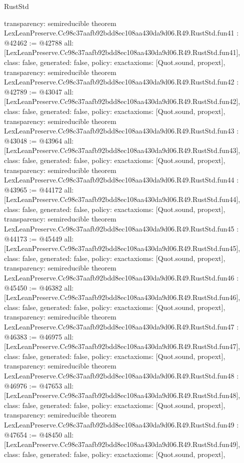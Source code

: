 \begin{lexlean}{RustStd}
\begin{coremodule}
{  transparency: semireducible
}
theorem LexLeanPreserve.Cc98c37aafb92bdd8ec108aa430da9d06.R49.RustStd.fun41 : @42462 := @42788 {
  all: [LexLeanPreserve.Cc98c37aafb92bdd8ec108aa430da9d06.R49.RustStd.fun41],
  class: false,
  generated: false,
  policy: exact{axioms: [Quot.sound, propext]},
  transparency: semireducible
}
theorem LexLeanPreserve.Cc98c37aafb92bdd8ec108aa430da9d06.R49.RustStd.fun42 : @42789 := @43047 {
  all: [LexLeanPreserve.Cc98c37aafb92bdd8ec108aa430da9d06.R49.RustStd.fun42],
  class: false,
  generated: false,
  policy: exact{axioms: [Quot.sound, propext]},
  transparency: semireducible
}
theorem LexLeanPreserve.Cc98c37aafb92bdd8ec108aa430da9d06.R49.RustStd.fun43 : @43048 := @43964 {
  all: [LexLeanPreserve.Cc98c37aafb92bdd8ec108aa430da9d06.R49.RustStd.fun43],
  class: false,
  generated: false,
  policy: exact{axioms: [Quot.sound, propext]},
  transparency: semireducible
}
theorem LexLeanPreserve.Cc98c37aafb92bdd8ec108aa430da9d06.R49.RustStd.fun44 : @43965 := @44172 {
  all: [LexLeanPreserve.Cc98c37aafb92bdd8ec108aa430da9d06.R49.RustStd.fun44],
  class: false,
  generated: false,
  policy: exact{axioms: [Quot.sound, propext]},
  transparency: semireducible
}
theorem LexLeanPreserve.Cc98c37aafb92bdd8ec108aa430da9d06.R49.RustStd.fun45 : @44173 := @45449 {
  all: [LexLeanPreserve.Cc98c37aafb92bdd8ec108aa430da9d06.R49.RustStd.fun45],
  class: false,
  generated: false,
  policy: exact{axioms: [Quot.sound, propext]},
  transparency: semireducible
}
theorem LexLeanPreserve.Cc98c37aafb92bdd8ec108aa430da9d06.R49.RustStd.fun46 : @45450 := @46382 {
  all: [LexLeanPreserve.Cc98c37aafb92bdd8ec108aa430da9d06.R49.RustStd.fun46],
  class: false,
  generated: false,
  policy: exact{axioms: [Quot.sound, propext]},
  transparency: semireducible
}
theorem LexLeanPreserve.Cc98c37aafb92bdd8ec108aa430da9d06.R49.RustStd.fun47 : @46383 := @46975 {
  all: [LexLeanPreserve.Cc98c37aafb92bdd8ec108aa430da9d06.R49.RustStd.fun47],
  class: false,
  generated: false,
  policy: exact{axioms: [Quot.sound, propext]},
  transparency: semireducible
}
theorem LexLeanPreserve.Cc98c37aafb92bdd8ec108aa430da9d06.R49.RustStd.fun48 : @46976 := @47653 {
  all: [LexLeanPreserve.Cc98c37aafb92bdd8ec108aa430da9d06.R49.RustStd.fun48],
  class: false,
  generated: false,
  policy: exact{axioms: [Quot.sound, propext]},
  transparency: semireducible
}
theorem LexLeanPreserve.Cc98c37aafb92bdd8ec108aa430da9d06.R49.RustStd.fun49 : @47654 := @48450 {
  all: [LexLeanPreserve.Cc98c37aafb92bdd8ec108aa430da9d06.R49.RustStd.fun49],
  class: false,
  generated: false,
  policy: exact{axioms: [Quot.sound, propext]},
}
\end{coremodule}
\end{lexlean}
